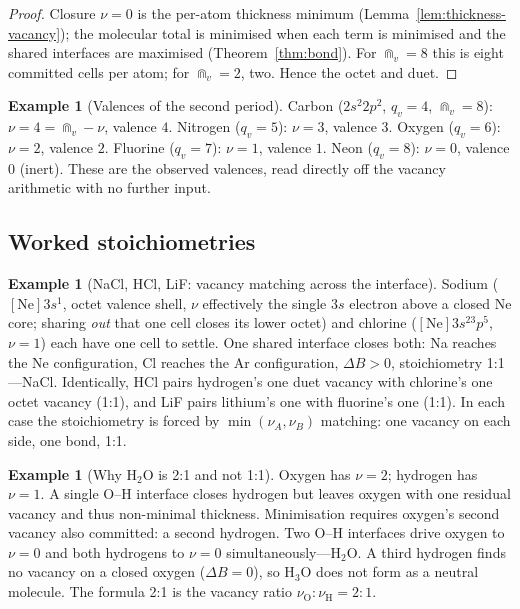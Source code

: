 \documentclass[11pt,a4paper]{article}
\theoremstyle{thmstyle}
\theoremstyle{definition}
\newtheorem{example}[theorem]{Example}
\theoremstyle{remark}
\newcommand{\thick}{B}                 %
\newcommand{\vac}{\nu}                 %
\begin{document}
\begin{proof}
Closure $\vac=0$ is the per-atom thickness minimum
(Lemma~\ref{lem:thickness-vacancy}); the molecular total is minimised when
each term is minimised and the shared interfaces are maximised
(Theorem~\ref{thm:bond}). For $\Cap_v=8$ this is eight committed cells per
atom; for $\Cap_v=2$, two. Hence the octet and duet.
\end{proof}

\begin{example}[Valences of the second period]
\label{ex:valences}
Carbon ($2s^2 2p^2$, $q_v=4$, $\Cap_v=8$): $\vac=4=\Cap_v-\vac$, valence
$4$. Nitrogen ($q_v=5$): $\vac=3$, valence $3$. Oxygen ($q_v=6$):
$\vac=2$, valence $2$. Fluorine ($q_v=7$): $\vac=1$, valence $1$. Neon
($q_v=8$): $\vac=0$, valence $0$ (inert). These are the observed
valences, read directly off the vacancy arithmetic with no further input.
\end{example}

\subsection{Worked stoichiometries}

\begin{example}[NaCl, HCl, LiF: vacancy matching across the interface]
\label{ex:salts}
Sodium ($[\mathrm{Ne}]3s^1$, octet valence shell, $\vac$ effectively the
single $3s$ electron above a closed Ne core; sharing \emph{out} that one
cell closes its lower octet) and chlorine ($[\mathrm{Ne}]3s^23p^5$,
$\vac=1$) each have one cell to settle. One shared interface closes both:
Na reaches the Ne configuration, Cl reaches the Ar configuration,
$\Delta\thick>0$, stoichiometry 1:1---NaCl. Identically, HCl pairs
hydrogen's one duet vacancy with chlorine's one octet vacancy (1:1), and
LiF pairs lithium's one with fluorine's one (1:1). In each case the
stoichiometry is forced by $\min(\vac_A,\vac_B)$ matching: one vacancy on
each side, one bond, 1:1.
\end{example}

\begin{example}[Why H$_2$O is 2:1 and not 1:1]
\label{ex:water}
Oxygen has $\vac=2$; hydrogen has $\vac=1$. A single O--H interface closes
hydrogen but leaves oxygen with one residual vacancy and thus
non-minimal thickness. Minimisation requires oxygen's second vacancy also
committed: a second hydrogen. Two O--H interfaces drive oxygen to
$\vac=0$ and both hydrogens to $\vac=0$ simultaneously---H$_2$O. A third
hydrogen finds no vacancy on a closed oxygen ($\Delta\thick=0$), so
H$_3$O does not form as a neutral molecule. The formula 2:1 is the
vacancy ratio $\vac_{\mathrm O}:\vac_{\mathrm H}=2:1$.
\end{example}
\end{document}
